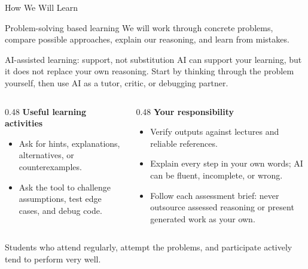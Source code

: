 \documentclass[aspectratio=169]{beamer}
\begin{document}
\begin{frame}{How We Will Learn}
\begin{block}{Problem-solving based learning}
We will work through concrete problems, compare possible approaches, explain our reasoning, and learn from mistakes.
\end{block}

\begin{block}{AI-assisted learning: support, not substitution}
AI can support your learning, but it does not replace your own reasoning. Start by thinking through the problem yourself, then use AI as a tutor, critic, or debugging partner.
\end{block}

\begin{columns}[T]
  \begin{column}{0.48\textwidth}
    \scriptsize
    \textbf{Useful learning activities}
    \begin{itemize}\scriptsize\setlength{\itemsep}{0pt}
      \item Ask for hints, explanations, alternatives, or counterexamples.
      \item Ask the tool to challenge assumptions, test edge cases, and debug code.
    \end{itemize}
  \end{column}
  \begin{column}{0.48\textwidth}
    \scriptsize
    \textbf{Your responsibility}
    \begin{itemize}\scriptsize\setlength{\itemsep}{0pt}
      \item Verify outputs against lectures and reliable references.
      \item Explain every step in your own words; AI can be fluent, incomplete, or wrong.
      \item Follow each assessment brief: never outsource assessed reasoning or present generated work as your own.
    \end{itemize}
  \end{column}
\end{columns}

\vspace{-0.05cm}
\begin{center}\scriptsize
Students who attend regularly, attempt the problems, and participate actively tend to perform very well.
\end{center}
\end{frame}
\end{document}

